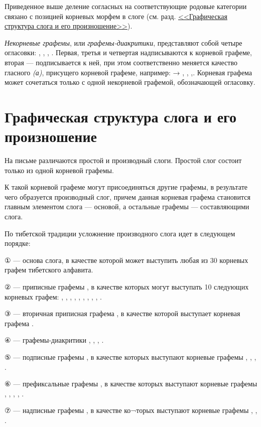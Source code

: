 Приведенное выше деление согласных на соответствующие родовые категории связано с позицией корневых морфем в слоге (см. разд. \hyperref[sec:gss]{<<Графическая структура слога и его произношение>>}).

\emph{Некорневые графемы}, или \emph{графемы-диакритики}, представляют собой четыре огласовки: , , , . Первая, третья и четвертая надписываются к корневой графеме, вторая --- подписывается к ней, при этом соответственно меняется качество гласного \textit{(а)}, присущего корневой графеме, например:  {\unifont →} , , ,. Корневая графема может сочетаться только с одной некорневой графемой, обозначающей огласовку.

\section{Графическая структура слога и его произношение}
\label{sec:gss}

На письме различаются простой и производный слоги. Простой слог состоит только из одной корневой графемы.

К такой корневой графеме могут присоединяться другие графемы, в результате чего образуется производный слог, причем данная корневая графема становится главным элементом слога --- основой, а остальные графемы --- составляющими слога.

По тибетской традиции усложнение производного слога идет в следующем порядке:
\begin{description}
	\item {\unifont ①} --- основа слога, в качестве которой может выступить любая из 30 корневых графем тибетского алфавита.
	\item {\unifont ②} --- приписные графемы , в качестве которых могут выступать 10 следующих корневых графем: , , , , , , , , , .
	\item {\unifont ③} --- вторичная приписная графема , в качестве которой выступает корневая графема .
	\item {\unifont ④} --- графемы-диакритики , , , .
	\item {\unifont ⑤} --- подписные графемы , в качестве которых выступают корневые графемы , , , .
	\item {\unifont ⑥} --- префиксальные графемы , в качестве которых выступают корневые графемы , , , , .
	\item {\unifont ⑦} --- надписные графемы , в качестве ко¬торых выступают корневые графемы , , .
\end{description}


